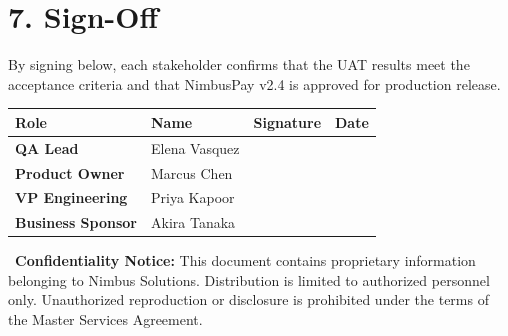 \section*{\color{primaryNavy}7. Sign-Off}
\sectionline

By signing below, each stakeholder confirms that the UAT results meet the acceptance criteria and that NimbusPay v2.4 is approved for production release.

\vspace{10pt}

\begin{tabularx}{\textwidth}{@{}>{\bfseries}l X l l@{}}
  \toprule
  \rowcolor{primaryNavy}
  \color{white}\textbf{Role} & \color{white}\textbf{Name} & \color{white}\textbf{Signature} & \color{white}\textbf{Date} \\
  \midrule
  QA Lead          & Elena Vasquez      & \hspace{3cm} & \hspace{2.2cm} \\
  \midrule
  Product Owner    & Marcus Chen        & \hspace{3cm} & \hspace{2.2cm} \\
  \midrule
  VP Engineering   & Priya Kapoor       & \hspace{3cm} & \hspace{2.2cm} \\
  \midrule
  Business Sponsor & Akira Tanaka       & \hspace{3cm} & \hspace{2.2cm} \\
  \bottomrule
\end{tabularx}

\vspace{10pt}

\begin{tcolorbox}[
  enhanced,
  colback=bgLight,
  colframe=primaryNavy,
  boxrule=1pt,
  left=12pt,
  right=12pt,
  top=8pt,
  bottom=8pt,
  sharp corners
]
  {\footnotesize\color{primaryNavy}\faLock\ \textbf{Confidentiality Notice:} This document contains proprietary information belonging to Nimbus Solutions. Distribution is limited to authorized personnel only. Unauthorized reproduction or disclosure is prohibited under the terms of the Master Services Agreement.}
\end{tcolorbox}
